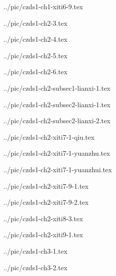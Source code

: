 

../pic/czds1-ch1-xiti6-9.tex



../pic/czds1-ch2-3.tex



../pic/czds1-ch2-4.tex



../pic/czds1-ch2-5.tex



../pic/czds1-ch2-6.tex



../pic/czds1-ch2-subsec1-lianxi-1.tex



../pic/czds1-ch2-subsec2-lianxi-1.tex



../pic/czds1-ch2-subsec2-lianxi-2.tex



../pic/czds1-ch2-xiti7-1-qiu.tex



../pic/czds1-ch2-xiti7-1-yuanzhu.tex



../pic/czds1-ch2-xiti7-1-yuanzhui.tex



../pic/czds1-ch2-xiti7-9-1.tex



../pic/czds1-ch2-xiti7-9-2.tex



../pic/czds1-ch2-xiti8-3.tex



../pic/czds1-ch2-xiti9-1.tex



../pic/czds1-ch3-1.tex



../pic/czds1-ch3-2.tex




